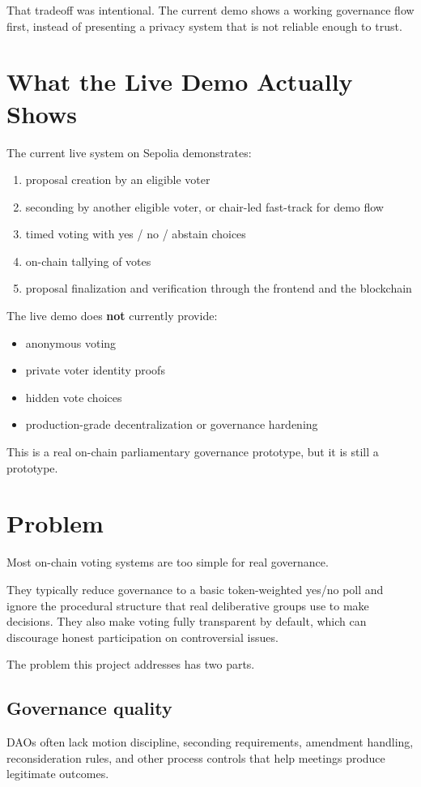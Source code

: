 \documentclass[12pt]{article}
\begin{document}
That tradeoff was intentional. The current demo shows a working governance flow first, instead of presenting a privacy system that is not reliable enough to trust.

\section{What the Live Demo Actually Shows}

The current live system on Sepolia demonstrates:
\begin{enumerate}
    \item proposal creation by an eligible voter
    \item seconding by another eligible voter, or chair-led fast-track for demo flow
    \item timed voting with yes / no / abstain choices
    \item on-chain tallying of votes
    \item proposal finalization and verification through the frontend and the blockchain
\end{enumerate}

The live demo does \textbf{not} currently provide:
\begin{itemize}
    \item anonymous voting
    \item private voter identity proofs
    \item hidden vote choices
    \item production-grade decentralization or governance hardening
\end{itemize}

This is a real on-chain parliamentary governance prototype, but it is still a prototype.

\section{Problem}

Most on-chain voting systems are too simple for real governance.

They typically reduce governance to a basic token-weighted yes/no poll and ignore the procedural structure that real deliberative groups use to make decisions. They also make voting fully transparent by default, which can discourage honest participation on controversial issues.

The problem this project addresses has two parts.

\subsection{Governance quality}
DAOs often lack motion discipline, seconding requirements, amendment handling, reconsideration rules, and other process controls that help meetings produce legitimate outcomes.
\end{document}
